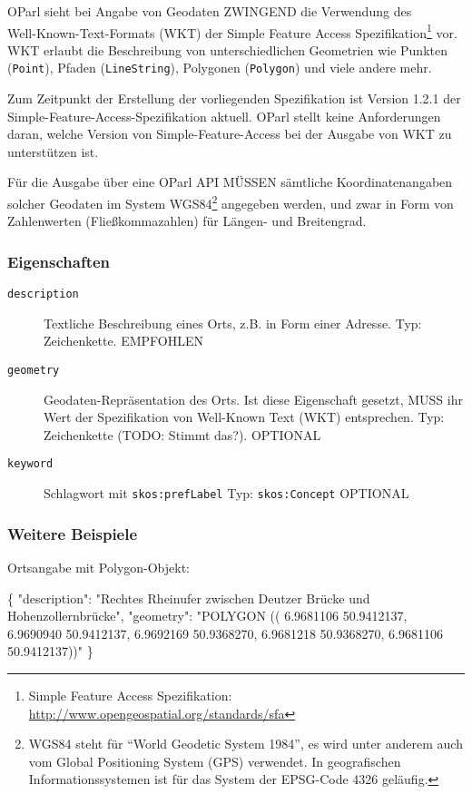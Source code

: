 \documentclass[,a4paper]{article}
\newenvironment{Shaded}{}{}
\newcommand{\DataTypeTok}[1]{\textcolor[rgb]{0.56,0.13,0.00}{{#1}}}
\newcommand{\StringTok}[1]{\textcolor[rgb]{0.25,0.44,0.63}{{#1}}}
\newcommand{\FunctionTok}[1]{\textcolor[rgb]{0.02,0.16,0.49}{{#1}}}
\begin{document}
OParl sieht bei Angabe von Geodaten ZWINGEND die Verwendung
des\\Well-Known-Text-Formats (WKT) der Simple Feature Access
Spezifikation\footnote{Simple Feature Access Spezifikation:
  \url{http://www.opengeospatial.org/standards/sfa}} vor. WKT erlaubt
die Beschreibung von unterschiedlichen Geometrien wie Punkten
(\texttt{Point}), Pfaden (\texttt{LineString}), Polygonen
(\texttt{Polygon}) und viele andere mehr.

Zum Zeitpunkt der Erstellung der vorliegenden Spezifikation ist Version
1.2.1 der Simple-Feature-Access-Spezifikation aktuell. OParl stellt
keine Anforderungen daran, welche Version von Simple-Feature-Access bei
der Ausgabe von WKT zu unterstützen ist.

Für die Ausgabe über eine OParl API MÜSSEN sämtliche Koordinatenangaben
solcher Geodaten im System WGS84\footnote{WGS84 steht für ``World
  Geodetic System 1984'', es wird unter anderem auch vom Global
  Positioning System (GPS) verwendet. In geografischen
  Informationssystemen ist für das System der EPSG-Code 4326 geläufig.}
angegeben werden, und zwar in Form von Zahlenwerten (Fließkommazahlen)
für Längen- und Breitengrad.

\subsubsection{Eigenschaften}\label{eigenschaften-9}

\begin{description}
\item[\texttt{description}]
Textliche Beschreibung eines Orts, z.B. in Form einer Adresse. Typ:
Zeichenkette. EMPFOHLEN
\item[\texttt{geometry}]
Geodaten-Repräsentation des Orts. Ist diese Eigenschaft gesetzt, MUSS
ihr Wert der Spezifikation von Well-Known Text (WKT) entsprechen. Typ:
Zeichenkette (TODO: Stimmt das?). OPTIONAL
\item[\texttt{keyword}]
Schlagwort mit \texttt{skos:prefLabel} Typ: \texttt{skos:Concept}
OPTIONAL
\end{description}

\subsubsection{Weitere Beispiele}\label{weitere-beispiele}

Ortsangabe mit Polygon-Objekt:

\begin{Shaded}
\begin{Highlighting}[]
\FunctionTok{\{}
    \DataTypeTok{"description"}\FunctionTok{:} \StringTok{"Rechtes Rheinufer zwischen Deutzer}
\StringTok{        Brücke und Hohenzollernbrücke"}\FunctionTok{,}
    \DataTypeTok{"geometry"}\FunctionTok{:} \StringTok{"POLYGON ((}
\StringTok{                6.9681106 50.9412137,}
\StringTok{                6.9690940 50.9412137,}
\StringTok{                6.9692169 50.9368270,}
\StringTok{                6.9681218 50.9368270,}
\StringTok{                6.9681106 50.9412137))"}
\FunctionTok{\}}
\end{Highlighting}
\end{Shaded}
\end{document}
